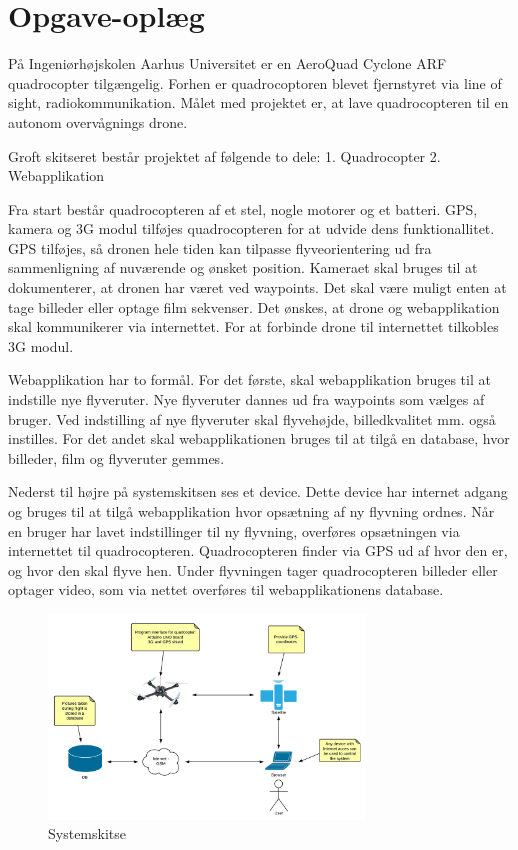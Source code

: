 \chapter{Opgave-oplæg}

\vspace{-20pt}

På Ingeniørhøjskolen Aarhus Universitet er en AeroQuad Cyclone ARF quadrocopter tilgængelig.
Forhen er quadrocoptoren blevet fjernstyret via line of sight, radiokommunikation. Målet med projektet er, at lave quadrocopteren til en autonom overvågnings drone.

Groft skitseret består projektet af følgende to dele: 
1. Quadrocopter
2. Webapplikation

Fra start består quadrocopteren af et stel, nogle motorer og et batteri. GPS, kamera og 3G modul tilføjes quadrocopteren for at udvide dens funktionallitet. GPS tilføjes, så dronen hele tiden kan tilpasse flyveorientering ud fra sammenligning af nuværende og ønsket position. Kameraet skal bruges til at dokumenterer, at dronen har været ved waypoints. Det skal være muligt enten at tage billeder eller optage film sekvenser. Det ønskes, at drone og webapplikation skal kommunikerer via internettet. For at forbinde drone til internettet tilkobles 3G modul.

Webapplikation har to formål. For det første, skal webapplikation bruges til at indstille nye flyveruter. Nye flyveruter dannes ud fra waypoints som vælges af bruger. Ved indstilling af nye flyveruter skal flyvehøjde, billedkvalitet mm. også instilles. For det andet skal webapplikationen bruges til at tilgå en database, hvor billeder, film og flyveruter gemmes.

Nederst til højre på systemskitsen ses et device. Dette device har internet adgang og bruges til at tilgå webapplikation hvor opsætning af ny flyvning ordnes.  Når en bruger har lavet indstillinger til ny flyvning, overføres opsætningen via internettet til quadrocopteren. Quadrocopteren finder via GPS ud af hvor den er, og hvor den skal flyve hen. Under flyvningen tager quadrocopteren billeder eller optager video, som via nettet overføres til webapplikationens database.

\vspace{-5pt}
\begin{figure}[H]
\centering
\includegraphics[width=0.75\textwidth]{Billeder/Projektbeskrivelse.png}
\vspace{-5pt}
\caption{Systemskitse}
\label{fig:Systemskitse}
\end{figure}